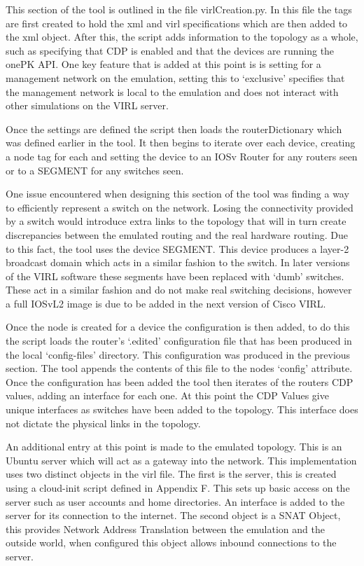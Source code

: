 \documentclass[11pt]{report}
\begin{document}
This section of the tool is outlined in the file virlCreation.py. In this file the tags are first created to hold the xml and virl specifications which are then added to the xml object. After this, the script adds information to the topology as a whole, such as specifying that CDP is enabled and that the devices are running the onePK API. One key feature that is added at this point is is setting for a management network on the emulation, setting this to `exclusive' specifies that the management network is local to the emulation and does not interact with other simulations on the VIRL server.

Once the settings are defined the script then loads the routerDictionary which was defined earlier in the tool. It then begins to iterate over each device, creating a node tag for each and setting the device to an IOSv Router for any routers seen or to a SEGMENT for any switches seen.

One issue encountered when designing this section of the tool was finding a way to efficiently represent a switch on the network. Losing the connectivity provided by a switch would introduce extra links to the topology that will in turn create discrepancies between the emulated routing and the real hardware routing. Due to this fact, the tool uses the device SEGMENT. This device produces a layer-2 broadcast domain which acts in a similar fashion to the switch. In later versions of the VIRL software these segments have been replaced with `dumb' switches. These act in a similar fashion and do not make real switching decisions, however a full IOSvL2 image is due to be added in the next version of Cisco VIRL.

Once the node is created for a device the configuration is then added, to do this the script loads the router's `.edited' configuration file that has been produced in the local `config-files' directory. This configuration was produced in the previous section. The tool appends the contents of this file to the nodes `config' attribute. Once the configuration has been added the tool then iterates of the routers CDP values, adding an interface for each one. At this point the CDP Values give unique interfaces as switches have been added to the topology. This interface does not dictate the physical links in the topology.

An additional entry at this point is made to the emulated topology. This is an Ubuntu server which will act as a gateway into the network. This implementation uses two distinct objects in the virl file. The first is the server, this is created using a cloud-init script defined in Appendix F. This sets up basic access on the server such as user accounts and home directories. An interface is added to the server for its connection to the internet. The second object is a SNAT Object, this provides Network Address Translation between the emulation and the outside world, when configured this object allows inbound connections to the server.
\end{document}
